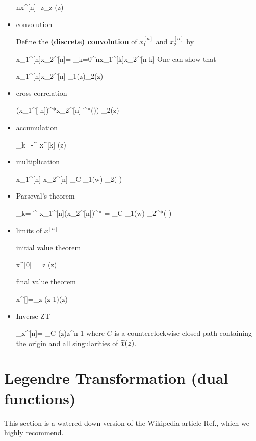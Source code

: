 \begin{itemize}
\beq
nx^{[n]}
\maparrow{\calz}
-z\partial_z (z)
\eeq

\item convolution

Define the {\bf (discrete)
convolution} 
of $x_1^{[n]}$
and $x_2^{[n]}$ by

\beq
x_1^{[n]}\circledast x_2^{[n]}=
\sum_{k=0}^nx_1^{[k]}x_2^{[n-k]}
\eeq
One can show that

\beq
x_1^{[n]}\circledast x_2^{[n]}
\maparrow{\calz}
_1(z)_2(z)
\eeq

\item cross-correlation

\beq
(x_1^{[-n]})^*\circledast x_2^{[n]}
\maparrow{\calz}
^*\left(\right))
_2(z)
\eeq

\item accumulation

\beq
\sum_{k=-\infty}^\infty
x^{[k]}
\maparrow{\calz}
(z)
\eeq

\item multiplication

\beq
x_1^{[n]} x_2^{[n]}
\maparrow{\calz}
\oint_C \;
_1(w)
_2\left(
{\color{red}}
\right)
\eeq

\item Parseval's theorem

\beq
\sum_{k=-\infty}^{\infty}
x_1^{[n]}(x_2^{[n]})^*
=
\oint_C \;
_1(w)
_2^*\left(
{\color{red}
}
\right)
\eeq

\item limits of $x^{[n]}$

initial value theorem

\beq
x^{[0]}=\lim_{z\rarrow \infty}
(z)
\eeq

final value theorem

\beq
x^{[\infty]}=\lim_{z}
(z-1)(z)
\eeq

\item Inverse ZT

\beq
{}
_{x^{[n]}}=
\oint_C
(z)z^{n-1}
\eeq
where $C$
is a counterclockwise
closed path
containing the origin and
all singularities 
of ${\widetilde{x}}(z)$.

\end{itemize}


\section{Legendre Transformation (dual functions)}
\label{sec-dual-fun}
This section is a
watered down version of
the Wikipedia article 
Ref.\cite{wiki-legendre-transformation},
which we highly recommend.



